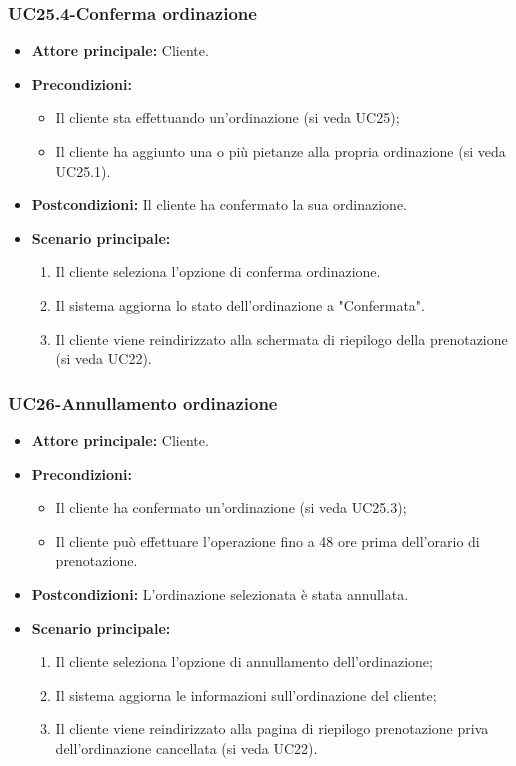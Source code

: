 \subsubsection{UC25.4-Conferma ordinazione}
\begin{itemize}
\item \textbf{Attore principale:} Cliente.
\item \textbf{Precondizioni:} 
    \begin{itemize}
        \item Il cliente sta effettuando un'ordinazione (si veda UC25);
        \item Il cliente ha aggiunto una o più pietanze alla propria ordinazione (si veda UC25.1).
    \end{itemize}
\item \textbf{Postcondizioni:} Il cliente ha confermato la sua ordinazione.
\item \textbf{Scenario principale:}
    \begin{enumerate}
        \item Il cliente seleziona l'opzione di conferma ordinazione.
        \item Il sistema aggiorna lo stato dell'ordinazione a "Confermata".
        \item Il cliente viene reindirizzato alla schermata di riepilogo della prenotazione (si veda UC22).
    \end{enumerate}
\end{itemize}


\subsubsection{UC26-Annullamento ordinazione}
\begin{itemize}
\item \textbf{Attore principale:} Cliente.
\item \textbf{Precondizioni:} 
\begin{itemize}
    \item Il cliente ha confermato un'ordinazione (si veda UC25.3);
    \item Il cliente può effettuare l'operazione fino a 48 ore prima dell'orario di prenotazione.
\end{itemize}
\item \textbf{Postcondizioni:} L'ordinazione selezionata è stata annullata.
\item \textbf{Scenario principale:}
\begin{enumerate}
    \item Il cliente seleziona l'opzione di annullamento dell'ordinazione;
    \item Il sistema aggiorna le informazioni sull'ordinazione del cliente;
    \item Il cliente viene reindirizzato alla pagina di riepilogo prenotazione priva dell'ordinazione cancellata (si veda UC22).
\end{enumerate}
\end{itemize}
